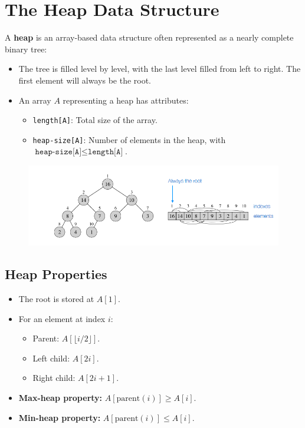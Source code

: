 \section{The Heap Data Structure}
A \textbf{heap} is an array-based data structure often represented as a nearly complete binary tree:
\begin{itemize}
    \item The tree is filled level by level, with the last level filled from left to right. The first element will always be the root.
    \item An array \( A \) representing a heap has attributes:
    \begin{itemize}
        \item \texttt{length[A]}: Total size of the array.
        \item \texttt{heap-size[A]}: Number of elements in the heap, with \( \texttt{heap-size[A]} \leq \texttt{length[A]} \).
    \end{itemize}
\end{itemize}
\begin{figure}[H]
    \centering
\includegraphics[width=0.8\linewidth]{Heap structure.png}
    \caption{}
    \label{fig:enter-label}
\end{figure}


\subsection{Heap Properties}
\begin{itemize}
    \item The root is stored at \( A[1] \).
    \item For an element at index \( i \):
    \begin{itemize}
        \item Parent: \( A[\lfloor i/2 \rfloor] \).
        \item Left child: \( A[2i] \).
        \item Right child: \( A[2i+1] \).
    \end{itemize}
    \item \textbf{Max-heap property:} \( A[\text{parent}(i)] \geq A[i] \).
    \item \textbf{Min-heap property:} \( A[\text{parent}(i)] \leq A[i] \).
\end{itemize}
